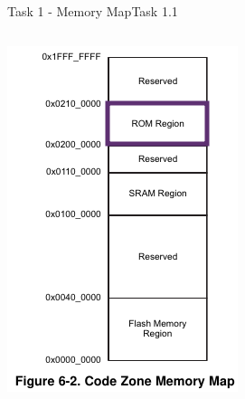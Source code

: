 {\begin{frame}[allowframebreaks]{Task 1 - Memory Map}{Task 1.1\vspace{0.25cm}}
\begin{solution}
\begin{columns}
\begin{column}{0.3\paperwidth}
        \includegraphics[height=0.4\paperheight]{./figures/rom.png}


\end{column}
\end{columns}
\end{solution}
\end{frame}}
